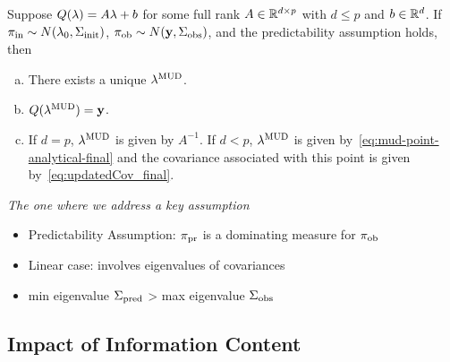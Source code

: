 \begin{frame}


\vskip 12pt
\begin{thm}\label{thm:MUD_existence_uniqueness}
Suppose  $Q(\lambda)=A\lambda+b$ for some full rank $A\in\mathbb{R}^{d\times p}$ with $d\leq p$ and $b\in\mathbb{R}^d$.
If $\operatorname*{\pi_{in}} \sim N(\lambda_0,\Sigma_\text{init})$, $\operatorname*{\pi_{ob}}\sim N(\mathbf{y},\Sigma_\text{obs})$, and the predictability assumption holds, then
\begin{enumerate}[(a)]
\item There exists a unique $\lambda^{\text{MUD}}$.
\item $Q(\lambda^{\text{MUD}}) = \mathbf{y}$.
\item If $d=p$, $\lambda^{\text{MUD}}$ is given by $A^{-1}$. If $d<p$, $\lambda^{\text{MUD}}$ is given by~\eqref{eq:mud-point-analytical-final} and the covariance associated with this point is given by~\eqref{eq:updatedCov_final}.
\end{enumerate}
\end{thm}

\end{frame}

\begin{frame}{\it The one where we address a key assumption}

\begin{itemize}
\item Predictability Assumption: $\operatorname*{\pi_{pr}}$ is a dominating measure for $\operatorname*{\pi_{ob}}$
\item Linear case: involves eigenvalues of covariances
\item min eigenvalue $\Sigma_\text{pred}$ > max eigenvalue $\Sigma_\text{obs}$
\end{itemize}

\end{frame}

\subsection{Impact of Information Content}

